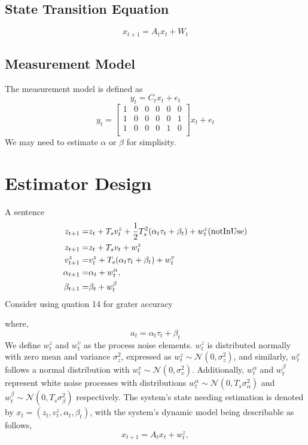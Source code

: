 \documentclass{article}
\begin{document}
\subsection{State Transition Equation}
\begin{equation}
    {x}_{t+1} = A_t {x}_t + W_t
\end{equation}

\subsection{Measurement Model}
The measurement model is defined as
\begin{equation}
y_t = C_t x_t + e_t
\end{equation}
\begin{equation}
    y_t  = 
    \begin{bmatrix}
        1 & 0 & 0 & 0 & 0 & 0 \\
        1 & 0 & 0 & 0 & 0 & 1 \\
        1 & 0 & 0 & 0 & 1 & 0 \\
    \end{bmatrix}
        x_t + e_t
\end{equation}
We may need to estimate \(\alpha\) or \(\beta\) for simplisity.

\section{Estimator Design}
A sentence
\begin{align}
    z_{t+1} =& z_t + T_s v_t^z + \frac{1}{2} T_s^2 (\alpha_t \tau_t + \beta_t) + w_t^z (\rm not In Use)\\
    z_{t+1} =& z_t + {T_s}{v_t} + w^{z}_{t}\\
    v_{t+1}^z =& v_t^z + T_s (\alpha_t \tau_t + \beta_t) + w_t^v\\
    \alpha_{t+1} =& \alpha_t + w_t^\alpha,\\
    \beta_{t+1} =& \beta_t + w_t^\beta\\
\end{align}
Consider using quation 14 for grater accuracy

where, 
\begin{equation}
    a_t =
    {\alpha_t}{\tau_t} + \beta_t
\end{equation}
We define $w_t^z$ and $w_t^v$ as the process noise elements.
$w_t^z$ is distributed normally with zero mean and variance
$\sigma_z^2$, expressed as $w_t^z \sim \mathcal{N}(0, \sigma_z^2)$, 
and similarly, $w_t^v$ follows a normal distribution with $w_t^v \sim \mathcal{N}(0, \sigma_v^2)$.
Additionally, $w_t^\alpha$ and $w_t^\beta$ represent white noise processes with distributions
$w_t^\alpha \sim \mathcal{N}(0, T_s \sigma_\alpha^2)$ and $w_t^\beta \sim \mathcal{N}(0, T_s \sigma_\beta^2)$ 
respectively. The system's state needing estimation is denoted by $x_t = (z_t, v_t^z, \alpha_t, \beta_t)$, 
with the system's dynamic model being describable as follows,
\begin{equation}
    x_{t+1} = A_t x_t + w_t^z,
\end{equation}
\end{document}
